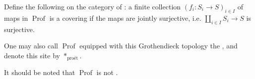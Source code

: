 \begin{definition} \label{definition:grothendieck_topology_on_the_category_of_profinite_sets}
    Define the following  on the category  of : a finite collection $(f_i : S_i \to S)_{i \in I}$ of maps in $\operatorname{Prof}$ is a covering if the maps are jointly surjective, i.e. $\coprod_{i \in I} S_i \to S$ is surjective.

    One may also call $\operatorname{Prof}$ equipped with this Grothendieck topology the , and denote this site by $*_{\text{pro\'et}}$.

    It should be noted that $\operatorname{Prof}$ is not . 
\end{definition}